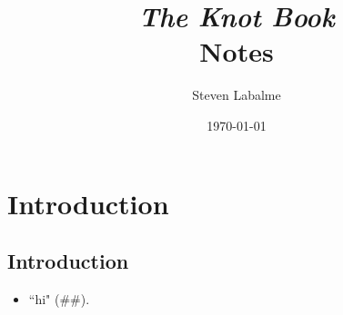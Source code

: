 \documentclass[titlepage]{article}
\title{{\Huge\emph{The Knot Book}}\\[5pt]\textcolor{gray!60!black}{Notes}\vspace{-0.5em}}
\author{Steven Labalme}
\date{\today}
\newcommand{\dq}[2]{``#1" (#2).}
\begin{document}
\maketitle



\tableofcontents
\listoffigures
\listoftables
\newpage



\pagestyle{fancy}
\fancyhf{}
\renewcommand{\headrulewidth}{0pt}
\section{Introduction}
\subsection{Introduction}
\begin{itemize}
    \item \dq{hi}{\#\#}
\end{itemize}
\end{document}

